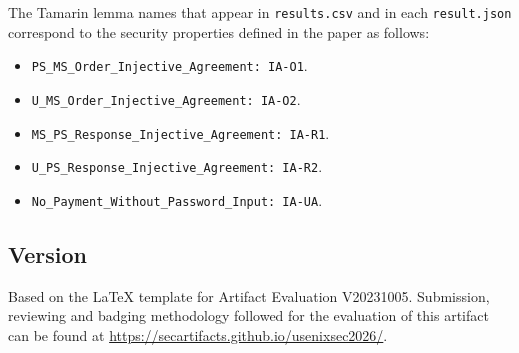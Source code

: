 \noindent The Tamarin lemma names that appear in \texttt{results.csv} and in each \texttt{result.json} correspond to the security properties defined in the paper as follows:
\begin{itemize}[itemsep=0pt, topsep=1pt, parsep=0pt, leftmargin=*]
    \item \texttt{PS\_MS\_Order\_Injective\_Agreement: IA-O1}.
    \item \texttt{U\_MS\_Order\_Injective\_Agreement: IA-O2}.
    \item \texttt{MS\_PS\_Response\_Injective\_Agreement: IA-R1}.
    \item \texttt{U\_PS\_Response\_Injective\_Agreement: IA-R2}.
    \item \texttt{No\_Payment\_Without\_Password\_Input: IA-UA}.
\end{itemize}


\subsection{Version}
Based on the LaTeX template for Artifact Evaluation V20231005. Submission,
reviewing and badging methodology followed for the evaluation of this artifact
can be found at \url{https://secartifacts.github.io/usenixsec2026/}.